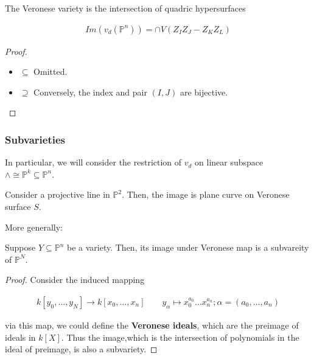 \documentclass[Total.tex]{subfiles}
\begin{document}
				\begin{proposition}
					The Veronese variety is the intersection of quadric hypersurfaces
					
					\begin{gather*}
						Im(v_d(\mathbb{P}^n))=\cap V(Z_IZ_J-Z_KZ_L)
					\end{gather*}
				\end{proposition}
				
				\begin{proof}
					\begin{itemize}
						\item $\subseteq$ Omitted.
						
						\item $\supseteq$ Conversely, the index and pair $(I,J)$ are bijective.
					\end{itemize}
				\end{proof}
				
				
				
				\subsubsection{Subvarieties}
				
				
				In particular, we will consider the restriction of $v_d$ on linear subspace $\wedge\cong \mathbb{P}^k\subseteq \mathbb{P}^n$.
				
				\begin{example}
					Consider a projective line in $\mathbb{P}^2$. Then, the image is plane curve on Veronese surface $S$.
				\end{example}
				
				More generally:
				
				\begin{lemma}
					Suppose $Y\subseteq \mathbb{P}^n$ be a variety. Then, its image under Veronese map is a subvareity of $\mathbb{P}^N$.
				\end{lemma}
				
				\begin{proof}
					Consider the induced mapping
					
					\begin{gather*}
						k[y_0,\dots,y_N]\rightarrow k[x_0,\dots,x_n]\qquad y_\alpha\mapsto x_0^{a_0}\dots x_n^{a_n};\alpha=(a_0,\dots,a_n)
					\end{gather*}
					
					via this map, we could define the \textbf{Veronese ideals}, which are the preimage of ideals in $k[X]$. Thus the image,which is the intersection of polynomials in the ideal of preimage, is also a subvariety.
				\end{proof}
				
\end{document}
